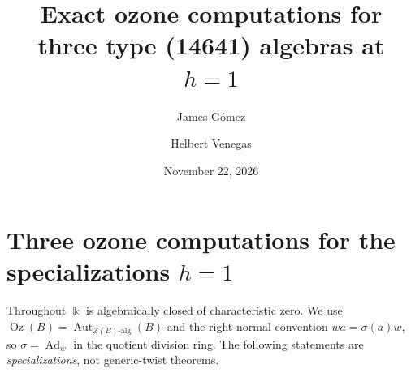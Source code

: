 \documentclass[11pt]{amsart}
\title{Exact ozone computations for three type (14641) algebras at $h=1$}
\author{James G\'omez \and Helbert Venegas}
\date{November 22, 2026}
\DeclareMathOperator{\Oz}{Oz}
\DeclareMathOperator{\Aut}{Aut}
\DeclareMathOperator{\Ad}{Ad}
\newcommand{\kk}{\Bbbk}
\begin{document}
\maketitle

\section{Three ozone computations for the specializations $h=1$}
\noindent Throughout $\kk$ is algebraically closed of characteristic zero. We use
$\Oz(B)=\Aut_{Z(B)\text{-alg}}(B)$ and the right-normal convention
$w a=\sigma(a)w$, so $\sigma=\Ad_w$ in the quotient division ring.
The following statements are \emph{specializations}, not generic-twist theorems.
\end{document}
